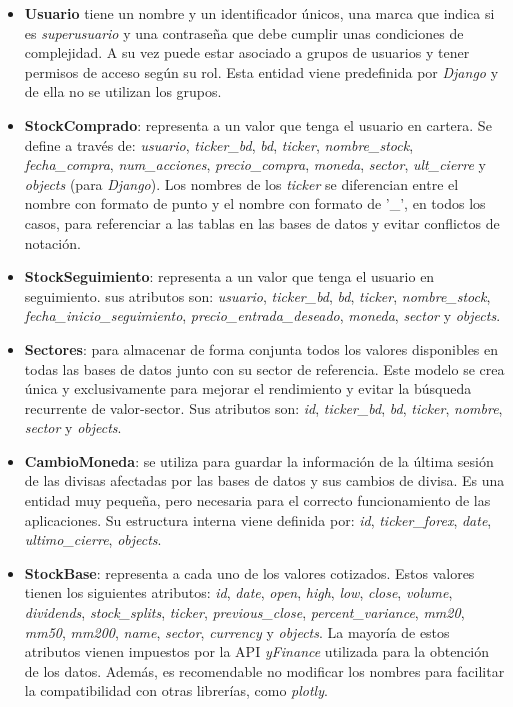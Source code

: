\begin{itemize}
\item
\textbf{Usuario} tiene un nombre y un identificador únicos, una marca que indica si es \emph{superusuario} y una contraseña que debe cumplir unas condiciones de complejidad. A su vez puede estar asociado a grupos de usuarios y tener permisos de acceso según su rol. Esta entidad viene predefinida por \emph{Django} y de ella no se utilizan los grupos. 

\item
\textbf{StockComprado}: representa a un valor que tenga el usuario en cartera. Se define a través de: \emph{usuario}, \emph{ticker\_bd}, \emph{bd}, \emph{ticker}, \emph{nombre\_stock}, \emph{fecha\_compra}, \emph{num\_acciones}, \emph{precio\_compra}, \emph{moneda}, \emph{sector}, \emph{ult\_cierre} y \emph{objects} (para \emph{Django}). Los nombres de los \emph{ticker} se diferencian entre el nombre con formato de punto y el nombre con formato de '\_', en todos los casos, para referenciar a las tablas en las bases de datos y evitar conflictos de notación. 

\item
\textbf{StockSeguimiento}: representa a un valor que tenga el usuario en seguimiento. sus atributos son: \emph{usuario}, \emph{ticker\_bd}, \emph{bd}, \emph{ticker}, \emph{nombre\_stock}, \emph{fecha\_inicio\_seguimiento}, \emph{precio\_entrada\_deseado}, \emph{moneda}, \emph{sector} y \emph{objects}.

\item 
\textbf{Sectores}: para almacenar de forma conjunta todos los valores disponibles en todas las bases de datos junto con su sector de referencia. Este modelo se crea única y exclusivamente para mejorar el rendimiento y evitar la búsqueda recurrente de valor-sector. Sus atributos son: \emph{id}, \emph{ticker\_bd}, \emph{bd}, \emph{ticker}, \emph{nombre}, \emph{sector} y \emph{objects}. 

\item
\textbf{CambioMoneda}: se utiliza para guardar la información de la última sesión de las divisas afectadas por las bases de datos y sus cambios de divisa. Es una entidad muy pequeña, pero necesaria para el correcto funcionamiento de las aplicaciones. Su estructura interna viene definida por: \emph{id}, \emph{ticker\_forex}, \emph{date}, \emph{ultimo\_cierre}, \emph{objects}.

\item 
\textbf{StockBase}: representa a cada uno de los valores cotizados. Estos valores tienen los siguientes atributos: \emph{id}, \emph{date}, \emph{open}, \emph{high}, \emph{low}, \emph{close}, \emph{volume}, \emph{dividends}, \emph{stock\_splits}, \emph{ticker}, \emph{previous\_close}, \emph{percent\_variance}, \emph{mm20}, \emph{mm50}, \emph{mm200}, \emph{name}, \emph{sector}, \emph{currency} y \emph{objects}. La mayoría de estos atributos vienen impuestos por la API \emph{yFinance} utilizada para la obtención de los datos. Además, es recomendable no modificar los nombres para facilitar la compatibilidad con otras librerías, como \emph{plotly}.
\end{itemize}

